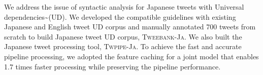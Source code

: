 We address the issue of syntactic analysis for Japanese tweets with Universal dependencies{\textasciitilde}(UD). We developed the compatible guidelines with existing Japanese and English tweet UD corpus and manually annotated 700 tweets from scratch to build Japanese tweet UD corpus, \textsc{Tweebank-Ja}. We also built the Japanese tweet processing tool, \textsc{Twpipe-Ja}. To achieve the fast and accurate pipeline processing, we adopted the feature caching for a joint model that enables 1.7 times faster processing while preserving the pipeline performance.
